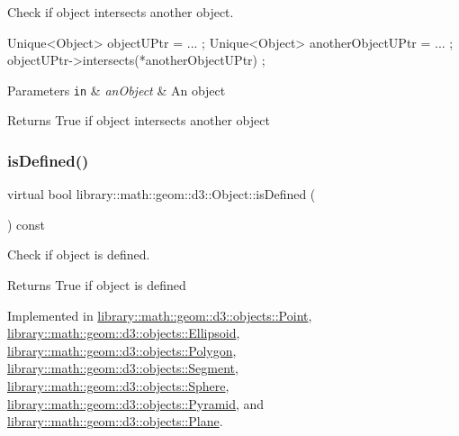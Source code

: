 Check if object intersects another object. 


\begin{DoxyCode}
Unique<Object> objectUPtr = ... ;
Unique<Object> anotherObjectUPtr = ... ;
objectUPtr->intersects(*anotherObjectUPtr) ;
\end{DoxyCode}



\begin{DoxyParams}[1]{Parameters}
\mbox{\tt in}  & {\em an\+Object} & An object \\
\hline
\end{DoxyParams}
\begin{DoxyReturn}{Returns}
True if object intersects another object 
\end{DoxyReturn}
\mbox{\label{classlibrary_1_1math_1_1geom_1_1d3_1_1_object_a2216442e322f0c3ca5f01a4efa22baf7}} 
\subsubsection{\texorpdfstring{is\+Defined()}{isDefined()}}
{\footnotesize\ttfamily virtual bool library\+::math\+::geom\+::d3\+::\+Object\+::is\+Defined (\begin{DoxyParamCaption}{ }\end{DoxyParamCaption}) const\hspace{0.3cm}{\ttfamily [pure virtual]}}



Check if object is defined. 

\begin{DoxyReturn}{Returns}
True if object is defined 
\end{DoxyReturn}


Implemented in \hyperlink{classlibrary_1_1math_1_1geom_1_1d3_1_1objects_1_1_point_a9874289efeb457ada4b32d7eb1e012f6}{library\+::math\+::geom\+::d3\+::objects\+::\+Point}, \hyperlink{classlibrary_1_1math_1_1geom_1_1d3_1_1objects_1_1_ellipsoid_adb42c2c7734c27dcb16d947fc5c9d76d}{library\+::math\+::geom\+::d3\+::objects\+::\+Ellipsoid}, \hyperlink{classlibrary_1_1math_1_1geom_1_1d3_1_1objects_1_1_polygon_a9fc4d76853843f90e2574cc1b25d6a7a}{library\+::math\+::geom\+::d3\+::objects\+::\+Polygon}, \hyperlink{classlibrary_1_1math_1_1geom_1_1d3_1_1objects_1_1_segment_a70a29c3822e4859a2e8cd4a52e1b26f5}{library\+::math\+::geom\+::d3\+::objects\+::\+Segment}, \hyperlink{classlibrary_1_1math_1_1geom_1_1d3_1_1objects_1_1_sphere_a0598bd75f8a34e07a3ad36cf10a7f098}{library\+::math\+::geom\+::d3\+::objects\+::\+Sphere}, \hyperlink{classlibrary_1_1math_1_1geom_1_1d3_1_1objects_1_1_pyramid_a349eca33d7ce6a379bc7f0c9367e459f}{library\+::math\+::geom\+::d3\+::objects\+::\+Pyramid}, and \hyperlink{classlibrary_1_1math_1_1geom_1_1d3_1_1objects_1_1_plane_a151515bf70e661c008023672e716e10a}{library\+::math\+::geom\+::d3\+::objects\+::\+Plane}.

